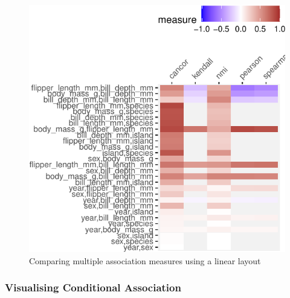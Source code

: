 \begin{Schunk}
\begin{figure}

{\centering \includegraphics{rj_paper_files/figure-latex/compare-linear-1} 

}

\caption[Comparing multiple association measures using a linear layout]{Comparing multiple association measures using a linear layout}\label{fig:compare-linear}
\end{figure}
\end{Schunk}

\hypertarget{visualising-conditional-association}{%
\subsubsection{Visualising Conditional
Association}\label{visualising-conditional-association}}


